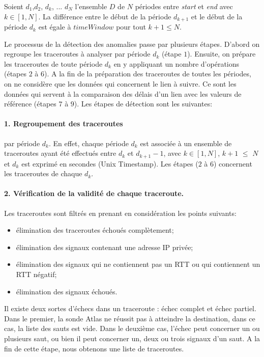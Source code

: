  Soient $ d_1 $,$  d_2 $, $d_k$, ... $ d_N $ l'ensemble $D$ de $N$ périodes entre \textit{start} et \textit{end} avec $k \in [1,N]$. La différence entre le début de la période $ d_{k+1} $ et le début de la période $ d_k $ est égale à $timeWindow$ pour tout $k+1 \leq N $.  

  Le processus de la détection des anomalies passe par plusieurs étapes. D'abord on  regroupe les traceroutes à analyser par période $d_k$ (étape $ 1 $). Ensuite, on prépare les traceroutes de toute  période $d_k$ en y appliquant un nombre d'opérations (étapes  $ 2 $ à $ 6 $). A la fin de la préparation des traceroutes de toutes les périodes, on ne considère que les données qui concernent le lien à suivre. Ce sont les données qui servent à la comparaison  des  délais d'un lien avec les valeurs de référence (étapes $ 7 $ à $9$). Les étapes de détection sont les suivantes:

\paragraph{1. Regroupement des traceroutes } par période $d_k$. En effet, chaque période $d_k$ est associée à un ensemble de traceroutes ayant été effectués entre $d_k$ et $d_{k+1} - 1 $, avec $k \in [1,N]$, $k+1$ $\leq$ $N $ et  $d_k$ est exprimé en secondes (Unix Timestamp). Les étapes  ($ 2 $ à $ 6 $) concernent  les traceroutes de chaque $d_k$.  

\paragraph{2. Vérification de la validité de chaque traceroute.} 
Les traceroutes sont filtrés en prenant en considération  les points suivants:
\begin{itemize}
	\item élimination des traceroutes échoués complètement;
	\item élimination des signaux contenant une adresse IP privée;
	\item élimination des signaux qui ne contiennent pas un RTT ou  qui contiennent un RTT négatif;
	\item  élimination des signaux échoués.
\end{itemize}

Il existe deux sortes d'échecs dans un traceroute : échec complet et échec partiel. Dans le premier,   la sonde Atlas ne réussit pas à atteindre la destination, dans ce cas, la liste des sauts est vide. Dans le deuxième cas, l'échec peut concerner un ou plusieurs saut, ou bien il peut concerner un, deux ou trois signaux d'un saut. A la fin de cette étape, nous obtenons une liste de traceroutes.


